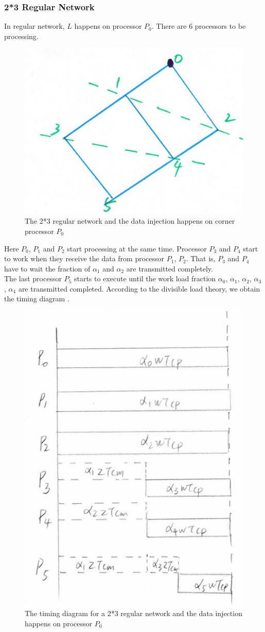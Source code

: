 \subsubsection{2*3 Regular Network}
In  regular network, $L$ happens on processor $P_{0}$.  There are $6$ processors to be processing.  
\begin{figure}[!ht]
\centering
\includegraphics[width=0.5\columnwidth]{figure/2t3.JPG}
\caption{The 2*3 regular network and the data injection happens on corner processor $P_{0}$}
\label{fig:2t3}
\end{figure}

Here $P_{0}$, $P_{1}$ and $P_{2}$ start processing at the same time.  Processor $P_{3}$ and $P_{4}$ start to work when they receive the data from processor $P_{1}$, $P_{2}$.  That is, $P_{3}$ and $P_{4}$ have to wait the fraction of $\alpha_{1}$ and $\alpha_{2}$ are transmitted completely.\\
The last processor $P_{5}$ starts to execute until the work load fraction $\alpha_{0}$, $\alpha_{1}$, $\alpha_{2}$, $\alpha_{3}$, $\alpha_{4}$ are transmitted completed.  According to the divisible load theory\cite{bharadwaj2003divisible}, we obtain the timing diagram .  

\newpage 
\begin{figure}[!ht]
\centering
\includegraphics[width=0.5\columnwidth]{figure/2t3d.JPG}
\caption{The timing diagram for a 2*3 regular network and the data injection happens on processor $P_{0}$}
\label{fig:2t3d}
\end{figure}

